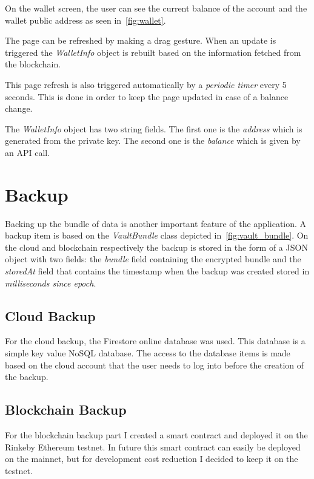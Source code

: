 \documentclass[a4paper,12pt]{report}
\begin{document}
On the wallet screen, the user can see the current balance of the account and
the wallet public address as seen in~\autoref{fig:wallet}.

The page can be refreshed by making a drag gesture. When an update is triggered
the \textit{WalletInfo} object is rebuilt based on the information fetched from
the blockchain.

This page refresh is also triggered automatically by a \textit{periodic timer}
every 5 seconds. This is done in order to keep the page updated in case of a
balance change.

The \textit{WalletInfo} object has two string fields. The first one is the
\textit{address} which is generated from the private key. The second one is the
\textit{balance} which is given by an API call.

\section{Backup}

Backing up the bundle of data is another important feature of the application.
A backup item is based on the \textit{VaultBundle} class depicted
in~\autoref{fig:vault_bundle}. On the cloud and blockchain respectively the
backup is stored in the form of a JSON object with two fields: the
\textit{bundle} field containing the encrypted bundle and the \textit{storedAt}
field that contains the timestamp when the backup was created stored in
\textit{milliseconds since epoch}.

\subsection{Cloud Backup}

For the cloud backup, the Firestore online database was used. This database is
a simple key value NoSQL database. The access to the database items is made
based on the cloud account that the user needs to log into before the creation
of the backup.

\subsection{Blockchain Backup}

For the blockchain backup part I created a smart contract and deployed it on
the Rinkeby Ethereum testnet. In future this smart contract can easily be
deployed on the mainnet, but for development cost reduction I decided to keep
it on the testnet.
\end{document}
